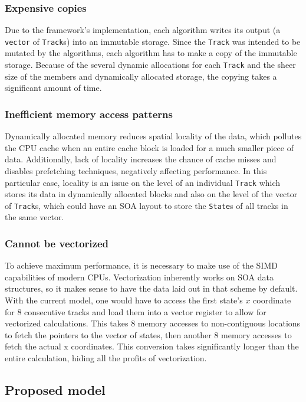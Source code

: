 \documentclass[12pt]{article}
\newcommand{\code}[1]{\texttt{#1}}
\begin{document}
\subsubsection{Expensive copies}

Due to the framework's implementation, each algorithm writes its output (a \code{vector} of \code{Track}s) into an immutable storage. Since the \code{Track} was intended to be mutated by the algorithms, each algorithm has to make a copy of the immutable storage. Because of the several dynamic allocations for each \code{Track} and the sheer size of the members and dynamically allocated storage, the copying takes a significant amount of time.

\subsubsection{Inefficient memory access patterns}

Dynamically allocated memory reduces spatial locality of the data, which pollutes the CPU cache when an entire cache block is loaded for a much smaller piece of data. Additionally, lack of locality increases the chance of cache misses and disables prefetching techniques, negatively affecting performance. In this particular case, locality is an issue on the level of an individual \code{Track} which stores its data in dynamically allocated blocks and also on the level of the vector of \code{Track}s, which could have an SOA layout to store the \code{State}s of all tracks in the same vector.

\subsubsection{Cannot be vectorized}

To achieve maximum performance, it is necessary to make use of the SIMD capabilities of modern CPUs. Vectorization inherently works on SOA data structures, so it makes sense to have the data laid out in that scheme by default. With the current model, one would have to access the first state's $x$ coordinate for 8 consecutive tracks and load them into a vector register to allow for vectorized calculations. This takes 8 memory accesses to non-contiguous locations to fetch the pointers to the vector of states, then another 8 memory accesses to fetch the actual x coordinates. This conversion takes significantly longer than the entire calculation, hiding all the profits of vectorization.

\subsection{Proposed model}
\end{document}
